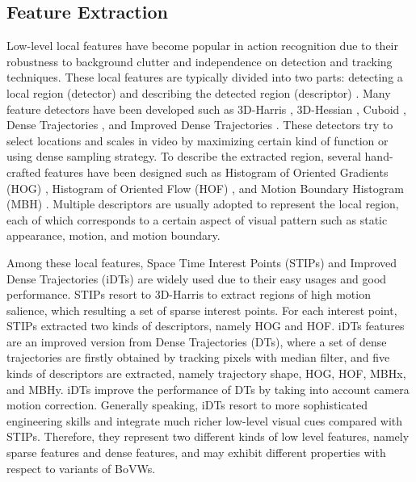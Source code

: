 \documentclass[twocolumn]{svjour3}          \smartqed  \usepackage{slashbox}
\begin{document}
\subsection{Feature Extraction}
Low-level local features have become popular in action recognition due to their robustness to background clutter and independence on detection and tracking techniques. These local features are typically divided into two parts: detecting a local region (detector) and describing the detected region (descriptor) \cite{WangUKLS09}. Many feature detectors have been developed such as 3D-Harris \cite{Laptev05}, 3D-Hessian \cite{WillemsTG08}, Cuboid \cite{DollarRCB05}, Dense Trajectories \cite{WangKSL13}, and Improved Dense Trajectories \cite{WangS13a}. These detectors try to select locations and scales in video by maximizing certain kind of function or using dense sampling strategy. To describe the extracted region, several hand-crafted features have been designed such as Histogram of Oriented Gradients (HOG) \cite{LaptevMSR08,WangKSL13}, Histogram of Oriented Flow (HOF) \cite{LaptevMSR08,WangKSL13}, and Motion Boundary Histogram (MBH) \cite{WangKSL13,WangS13a}. Multiple descriptors are usually adopted to represent the local region, each of which corresponds to a certain aspect of visual pattern such as static appearance, motion, and motion boundary.

Among these local features, Space Time Interest Points (STIPs) \cite{Laptev05} and Improved Dense Trajectories (iDTs) \cite{WangKSL13} are widely used due to their easy usages and good performance. STIPs resort to 3D-Harris to extract regions of high motion salience, which resulting a set of sparse interest points. For each interest point, STIPs extracted two kinds of descriptors, namely HOG and HOF. iDTs features are an improved version from Dense Trajectories (DTs), where a set of dense trajectories are firstly obtained by tracking pixels with median filter, and five kinds of descriptors are extracted, namely trajectory shape, HOG, HOF, MBHx, and MBHy. iDTs improve the performance of DTs by taking into account camera motion correction. Generally speaking, iDTs resort to more sophisticated engineering skills and integrate much richer low-level visual cues compared with STIPs. Therefore, they represent two different kinds of low level features, namely sparse features and dense features, and may exhibit different properties with respect to variants of BoVWs.
\end{document}
